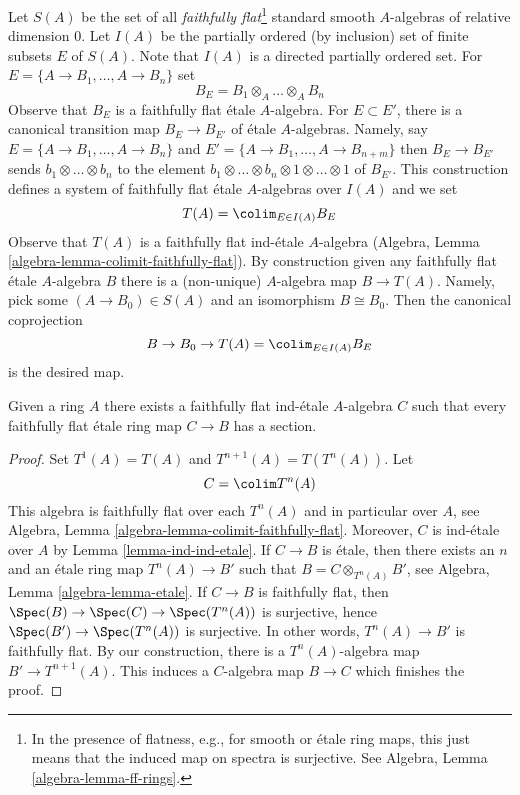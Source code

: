 \medskip\noindent
Let $S(A)$ be the set of all {\it faithfully flat}\footnote{In the presence
of flatness, e.g., for smooth or \'etale ring maps,
this just means that the induced map on spectra is surjective. See
Algebra, Lemma \ref{algebra-lemma-ff-rings}.}
standard smooth $A$-algebras of relative dimension $0$.
Let $I(A)$ be the partially ordered (by inclusion) set of finite
subsets $E$ of $S(A)$. Note that $I(A)$ is a directed partially
ordered set. For $E = \{A \to B_1, \ldots, A \to B_n\}$ set
$$
B_E = B_1 \otimes_A \ldots \otimes_A B_n
$$
Observe that $B_E$ is a faithfully flat \'etale $A$-algebra.
For $E \subset E'$, there is a canonical transition map $B_E \to B_{E'}$
of \'etale $A$-algebras. Namely, say $E = \{A \to B_1, \ldots, A \to B_n\}$
and $E' = \{A \to B_1, \ldots, A \to B_{n + m}\}$ then
$B_E \to B_{E'}$ sends $b_1 \otimes \ldots \otimes b_n$ to the
element $b_1 \otimes \ldots \otimes b_n \otimes 1 \otimes \ldots \otimes 1$
of $B_{E'}$. This construction defines a system of faithfully flat
\'etale $A$-algebras over $I(A)$ and we set
$$
T(A) = \colim_{E \in I(A)} B_E
$$
Observe that $T(A)$ is a faithfully flat ind-\'etale $A$-algebra
(Algebra, Lemma \ref{algebra-lemma-colimit-faithfully-flat}). By construction
given any faithfully flat \'etale $A$-algebra $B$ there is a (non-unique)
$A$-algebra map $B \to T(A)$. Namely, pick some $(A \to B_0) \in S(A)$
and an isomorphism $B \cong B_0$. Then the canonical coprojection
$$
B \to B_0 \to 
T(A) = \colim_{E \in I(A)} B_E
$$
is the desired map.

\begin{lemma}
\label{lemma-first-construction}
Given a ring $A$ there exists a faithfully flat ind-\'etale $A$-algebra $C$
such that every faithfully flat \'etale ring map $C \to B$ has a section.
\end{lemma}

\begin{proof}
Set $T^1(A) = T(A)$ and $T^{n + 1}(A) = T(T^n(A))$. Let
$$
C = \colim T^n(A)
$$
This algebra is faithfully flat over each $T^n(A)$ and in particular
over $A$, see
Algebra, Lemma \ref{algebra-lemma-colimit-faithfully-flat}.
Moreover, $C$ is ind-\'etale over $A$ by Lemma \ref{lemma-ind-ind-etale}.
If $C \to B$ is \'etale, then there exists an $n$ and an \'etale
ring map $T^n(A) \to B'$ such that $B = C \otimes_{T^n(A)} B'$, see
Algebra, Lemma \ref{algebra-lemma-etale}.
If $C \to B$ is faithfully flat, then $\Spec(B) \to \Spec(C) \to \Spec(T^n(A))$
is surjective, hence $\Spec(B') \to \Spec(T^n(A))$ is surjective.
In other words, $T^n(A) \to B'$ is faithfully flat.
By our construction, there is a $T^n(A)$-algebra map
$B' \to T^{n + 1}(A)$. This induces a $C$-algebra map $B \to C$
which finishes the proof.
\end{proof}

